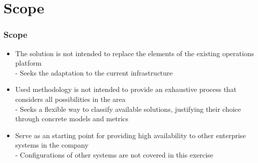 \section{Scope}

\begin{frame}%
\frametitle{Scope}

\begin{itemize}
  \item The solution is not intended to replace the elements of the existing operations platform\\
	- Seeks the adaptation to the current infrastructure
  \item Used methodology is not intended to provide an exhaustive process that considers all possibilities in the area\\
	- Seeks a flexible way to classify available solutions, justifying their choice through concrete models and metrics
  \item Serve as an starting point for providing high availability to other enterprise systems in the company\\
	- Configurations of other systems are not covered in this exercise
\end{itemize}

\end{frame}